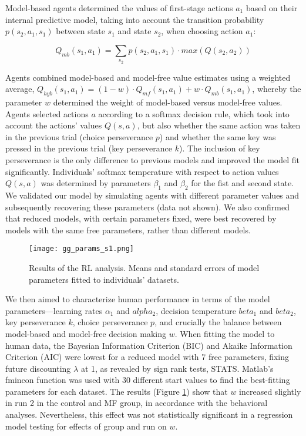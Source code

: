 \documentclass[11pt]{article} %
\begin{document}
Model-based agents determined the values of first-stage actions $a_{1}$ based on their internal predictive model, taking into account the transition probability $p(s_{2}, a_{1}, s_{1})$ between state $s_{1}$ and state $s_{2}$, when choosing action $a_{1}$:

\begin{equation}
Q_{mb}(s_{1}, a_{1}) = \sum_{s_{2}} p(s_{2}, a_{1}, s_{1}) \cdot max(Q(s_{2}, a_{2}))
\end{equation}

Agents combined model-based and model-free value estimates using a weighted average, $Q_{hyb}(s_{1}, a_{1}) = (1 - w) \cdot Q_{mf}(s_{1}, a_{1}) + w \cdot Q_{mb}(s_{1}, a_{1})$, whereby the parameter $w$ determined the weight of model-based versus model-free values. Agents selected actions $a$ according to a softmax decision rule, which took into account the actions' values $Q(s, a)$, but also whether the same action was taken in the previous trial (choice perseverance $p$) and whether the same key was pressed in the previous trial (key perseverance $k$). The inclusion of key perseverance is the only difference to previous models and improved the model fit significantly. Individuals' softmax temperature with respect to action values $Q(s, a)$ was determined by parameters $\beta_{1}$ and $\beta_{2}$ for the fist and second state. We validated our model by simulating agents with different parameter values and subsequently recovering these parameters (data not shown). We also confirmed that reduced models, with certain parameters fixed, were best recovered by models with the same free parameters, rather than different models. 

\begin{figure}
	\texttt{[image: gg\_params\_s1.png]}
	\caption{Results of the RL analysis. Means and standard errors of model parameters fitted to individuals' datasets.}
	\label{Params}
\end{figure}

We then aimed to characterize human performance in terms of the model parameters---learning rates $\alpha_{1}$ and $alpha_{2}$, decision temperature $beta_{1}$ and $beta_{2}$, key perseverance $k$, choice perseverance $p$, and crucially the balance between model-based and model-free decision making $w$. When fitting the model to human data, the Bayesian Information Criterion (BIC) and Akaike Information Criterion (AIC) were lowest for a reduced model with 7 free parameters, fixing future discounting $\lambda$ at 1, as revealed by sign rank tests, STATS. Matlab's fmincon function was used with 30 different start values to find the best-fitting parameters for each dataset. The results (Figure \ref{Params}) show that $w$ increased slightly in run 2 in the control and MF group, in accordance with the behavioral analyses. Nevertheless, this effect was not statistically significant in a regression model testing for effects of group and run on $w$.
\end{document}
